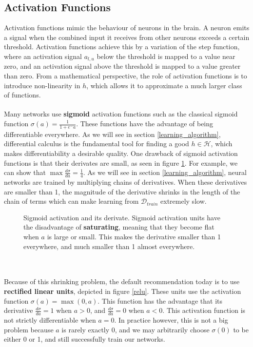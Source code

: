 \subsection{Activation Functions}
Activation functions mimic the behaviour of neurons in the brain. A neuron emits a signal when the combined input it receives from other neurons exceeds a certain threshold. Activation functions achieve this by a variation of the step function, where an activation signal $a_{l,u}$ below the threshold is mapped to a value near zero, and an activation signal above the threshold is mapped to a value greater than zero. From a mathematical perspective, the role of activation functions is to introduce non-linearity in $h$, which allows it to approximate a much larger class of functions.
\\\\
Many networks use \textbf{sigmoid} activation functions such as the classical sigmoid function $\sigma(a) = \frac{1}{1 + e^-a}$. These functions have the advantage of being differentiable everywhere. As we will see in section \ref{learning_algorithm}, differential calculus is the fundamental tool for finding a good $h \in \mathcal{H}$, which makes differentiability a desirable quality. One drawback of sigmoid activation functions is that their derivates are small, as seen in figure \ref{sigmoid}. For example, we can show that $\max \frac{d\sigma}{da} = \frac{1}{4}$. As we will see in section \ref{learning_algorithm}, neural networks are trained by multiplying chains of derivatives. When these derivatives are smaller than 1, the magnitude of the derivative shrinks in the length of the chain of terms which can make learning from $\mathcal{D}_{train}$ extremely slow.
\begin{figure}
	\centering
	
	\caption{Sigmoid activation and its derivate. Sigmoid activation units have the disadvantage of \textbf{saturating}, meaning that they become flat when $a$ is large or small. This makes the derivative smaller than 1 everywhere, and much smaller than 1 almost everywhere.}
	\label{sigmoid}
\end{figure}
\\\\
Because of this shrinking problem, the default recommendation today is to use \textbf{rectified linear units}, depicted in figure \ref{relu}. These units use the activation function $\sigma(a) = \max(0, a)$. This function has the advantage that its derivative $\frac{d\sigma}{da} = 1$ when $a > 0$, and $\frac{d\sigma}{da} = 0$ when $a < 0$. This activation function is not strictly differentiable when $a = 0$. In practice however, this is not a big problem because $a$ is rarely exactly 0, and we may arbitrarily choose $\sigma(0)$ to be either 0 or 1, and still successfully train our networks.

